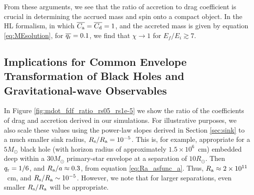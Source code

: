 From these arguments, we see that the ratio of accretion to drag coefficient is crucial in determining the accrued mass and spin onto a compact object. In the HL formalism, in which $\overline{C_{\rm a}}=\overline{C_{\rm d}}=1$, and the accreted mass is given by equation \eqref{eq:MEsolution}, for $\overline{q_{\rm r}}=0.1$, we find that $\chi\rightarrow1$ for $E_f/E_i \gtrsim 7$.

\subsection{Implications for Common Envelope Transformation of Black Holes and Gravitational-wave Observables}\label{sec:LIGO}

In Figure \ref{fig:mdot_fdf_ratio_rs05_rs1e-5} we show the ratio of the coefficients of drag and accretion derived in our simulations. For illustrative purposes, we also scale these values using the power-law slopes derived in Section \ref{sec:sink} to a much smaller sink radius, $R_{\rm s}/R_{\rm a}= 10^{-5}$. This is, for example, appropriate for a $5M_\odot$ black hole (with horizon radius of approximately $1.5\times10^6$~cm) embedded deep within a $30 M_\odot$ primary-star envelope at a separation of $10R_\odot$. Then $q_{\rm r} = 1/6$, and $R_{\rm a}/a\approx 0.3$, from equation \eqref{eq:Ra_asfunc_a}. Thus, $R_{\rm a} \approx 2 \times 10^{11}$~cm, and $R_{\rm s}/R_{\rm a} \sim 10^{-5}$. However, we note that for larger separations, even smaller $R_{\rm s}/R_{\rm a}$ will be appropriate. 


